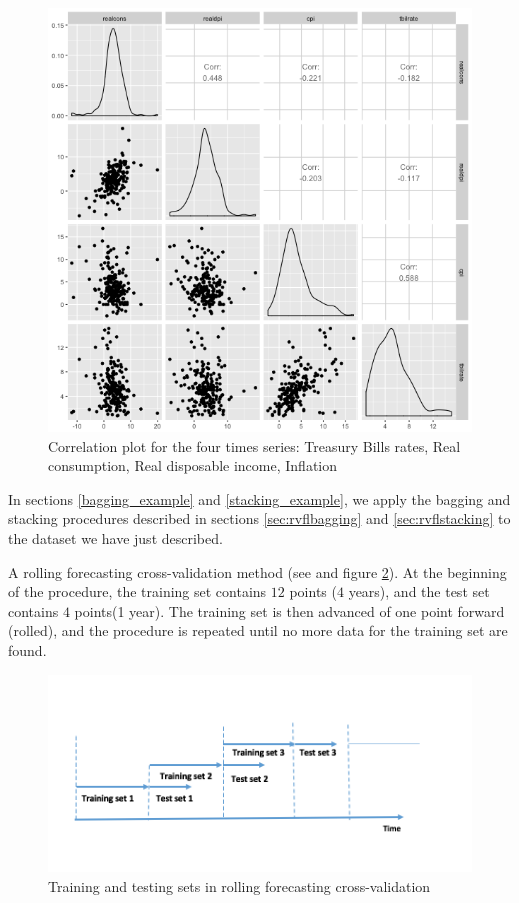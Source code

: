 \begin{figure}[!htb]
\centering
\includegraphics[width=14cm]{gfx/chapter-rvfl-ensembles/scatterplot.png}
\caption{Correlation plot for the four times series: Treasury Bills rates, Real consumption, Real disposable income, Inflation}
\label{corrplot}
\end{figure}


In sections \ref{bagging_example} and \ref{stacking_example}, we apply the bagging and stacking procedures described in sections \ref{sec:rvflbagging} and \ref{sec:rvflstacking} to the dataset we have just described. 


A rolling forecasting cross-validation method (see \cite{bergmeir2015note} and figure \ref{rolling_cv}). At the beginning of the procedure, the training set contains $12$ points ($4$ years), and the test set contains $4$ points(1 year). The training set is then advanced of one point forward (rolled), and the procedure is repeated until no more data for the training set are found.  

\begin{figure}[!htb]
\centering
\includegraphics[width=14cm]{gfx/chapter-rvfl-ensembles/rolling_cv.png}
\caption{Training and testing sets in rolling forecasting cross-validation}
\label{rolling_cv}
\end{figure}

